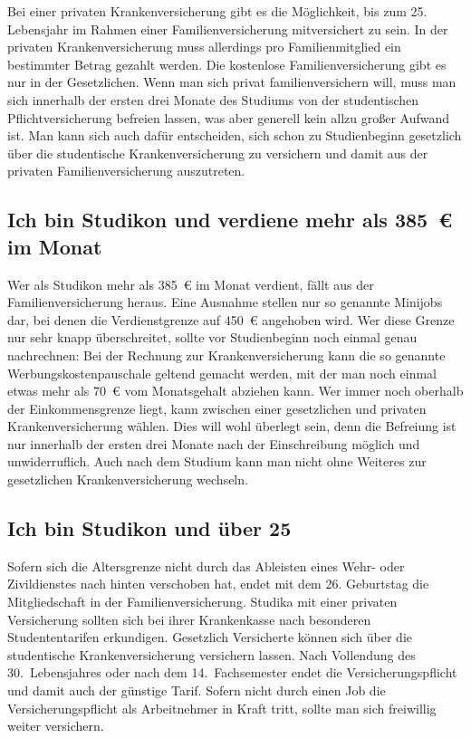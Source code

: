 Bei einer privaten Krankenversicherung gibt es die Möglichkeit, bis zum 25.
Lebensjahr im Rahmen einer Familienversicherung
mitversichert zu sein. In der privaten Krankenversicherung muss
allerdings pro Familienmitglied ein bestimmter Betrag gezahlt
werden. Die kostenlose Familienversicherung gibt es nur in der
Gesetzlichen. Wenn man sich privat familienversichern will, muss man
sich innerhalb der ersten drei Monate des Studiums von der
studentischen Pflichtversicherung befreien lassen, was aber generell
kein allzu großer Aufwand ist. Man kann sich auch dafür entscheiden,
sich schon zu Studienbeginn gesetzlich über die studentische
Krankenversicherung zu versichern und damit aus der privaten
Familienversicherung auszutreten.

\subsection*{Ich bin Studikon und verdiene mehr als 385~€ im Monat}

Wer als Studikon mehr als 385~€ im Monat verdient, fällt aus der
Familienversicherung heraus. Eine Ausnahme stellen nur so genannte
Minijobs dar, bei denen die Verdienstgrenze auf 450~€ angehoben
wird. Wer diese Grenze nur sehr knapp überschreitet, sollte vor
Studienbeginn noch einmal genau nachrechnen: Bei der Rechnung zur
Krankenversicherung kann die so genannte Werbungskostenpauschale
geltend gemacht werden, mit der man noch einmal etwas mehr als 70~€
vom Monatsgehalt abziehen kann. Wer immer noch oberhalb der
Einkommensgrenze liegt, kann zwischen einer gesetzlichen und privaten
Krankenversicherung wählen. Dies will wohl überlegt sein, denn die Befreiung
ist nur innerhalb der ersten drei Monate nach der Einschreibung möglich und
unwiderruflich. Auch nach dem Studium kann man nicht ohne Weiteres zur gesetzlichen
Krankenversicherung wechseln.

\subsection*{Ich bin Studikon und über 25}

Sofern sich die Altersgrenze nicht durch das Ableisten eines Wehr-
oder Zivildienstes nach hinten verschoben hat, endet mit dem
26. Geburtstag die Mitgliedschaft in der Familienversicherung. 
Studika mit einer privaten Versicherung sollten sich bei ihrer
Krankenkasse nach besonderen Studententarifen erkundigen. Gesetzlich
Versicherte können sich über die studentische
Krankenversicherung versichern lassen. Nach Vollendung des 30.~Lebensjahres
oder nach dem 14.~Fachsemester endet die Versicherungspflicht und damit
auch der günstige Tarif. Sofern nicht durch einen Job die Versicherungspflicht
als Arbeitnehmer in Kraft tritt, sollte man sich freiwillig
weiter versichern.

